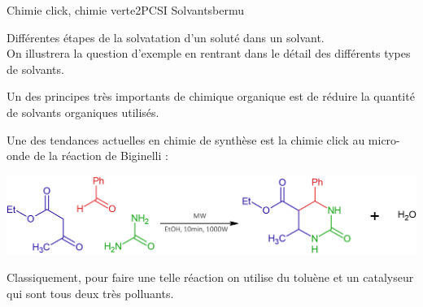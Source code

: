 
\begin{exercise}{Chimie click, chimie verte}{2}{PCSI}
{Solvants}{bermu}



\begin{questions}
    \questioncours Différentes étapes de la solvatation d'un soluté dans un solvant. \\
    On illustrera la question d'exemple en rentrant dans le détail des différents types de solvants.

\begin{EnvUplevel}
Un des principes très importants de chimique organique est de réduire la quantité de solvants organiques utilisés.

Une des tendances actuelles en chimie de synthèse est la chimie click au micro-onde de la réaction de Biginelli :
\begin{center}
    \includegraphics[width=.9\linewidth]{chimiePC/atomes/click.png}
\end{center}

\end{EnvUplevel}
    
    \question Classiquement, pour faire une telle réaction on utilise du toluène et un catalyseur qui sont tous deux très polluants.
    
    

\end{questions}
\end{exercise}
